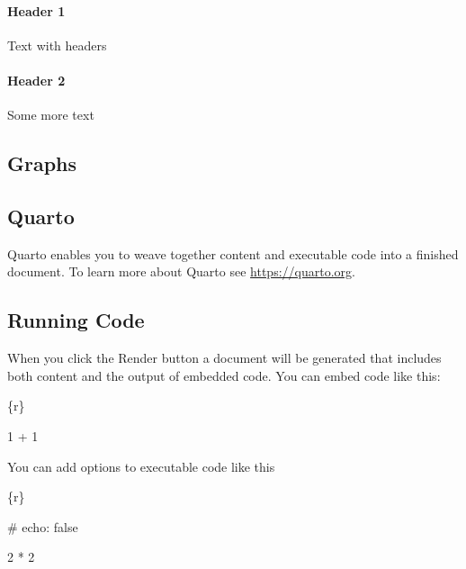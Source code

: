 \documentclass[
  letterpaper,
  DIV=11,
  numbers=noendperiod]{scrartcl}
\let\oldparagraph\paragraph
\renewcommand{\paragraph}[1]{\oldparagraph{#1}\mbox{}}
\begin{document}
\hypertarget{header-1}{%
\paragraph{Header 1}\label{header-1}}

Text with headers

\hypertarget{header-2}{%
\paragraph{Header 2}\label{header-2}}

Some more text

\hypertarget{graphs}{%
\subsection{Graphs}\label{graphs}}

\hypertarget{quarto}{%
\subsection{Quarto}\label{quarto}}

Quarto enables you to weave together content and executable code into a
finished document. To learn more about Quarto see
\url{https://quarto.org}.

\hypertarget{running-code}{%
\subsection{Running Code}\label{running-code}}

When you click the Render button a document will be generated that
includes both content and the output of embedded code. You can embed
code like this:

\{r\}

1 + 1

You can add options to executable code like this

\{r\}

\#\textbar{} echo: false

2 * 2
\end{document}
